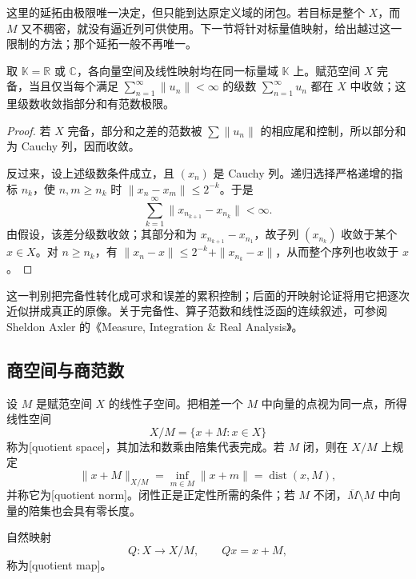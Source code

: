 这里的延拓由极限唯一决定，但只能到达原定义域的闭包。若目标是整个 \(X\)，而 \(M\) 又不稠密，就没有逼近列可供使用。下一节将针对标量值映射，给出越过这一限制的方法；那个延拓一般不再唯一。

\begin{proposition}\label{b1:prop:banach-series-criterion}
取 \(\mathbb K=\mathbb R\) 或 \(\mathbb C\)，各向量空间及线性映射均在同一标量域 \(\mathbb K\) 上。赋范空间 \(X\) 完备，当且仅当每个满足 \(\sum_{n=1}^\infty\|u_n\|<\infty\) 的级数 \(\sum_{n=1}^\infty u_n\) 都在 \(X\) 中收敛；这里级数收敛指部分和有范数极限。
\end{proposition}
\begin{proof}
若 \(X\) 完备，部分和之差的范数被 \(\sum\|u_n\|\) 的相应尾和控制，所以部分和为 Cauchy 列，因而收敛。

反过来，设上述级数条件成立，且 \((x_n)\) 是 Cauchy 列。递归选择严格递增的指标 \(n_k\)，使 \(n,m\geq n_k\) 时 \(\|x_n-x_m\|\leq2^{-k}\)。于是
\[
\sum_{k=1}^\infty\|x_{n_{k+1}}-x_{n_k}\|<\infty.
\]
由假设，该差分级数收敛；其部分和为 \(x_{n_{k+1}}-x_{n_1}\)，故子列 \((x_{n_k})\) 收敛于某个 \(x\in X\)。对 \(n\geq n_k\)，有 \(\|x_n-x\|\leq2^{-k}+\|x_{n_k}-x\|\)，从而整个序列也收敛于 \(x\)。
\end{proof}

这一判别把完备性转化成可求和误差的累积控制；后面的开映射论证将用它把逐次近似拼成真正的原像。关于完备性、算子范数和线性泛函的连续叙述，可参阅 Sheldon Axler 的《Measure, Integration \& Real Analysis》\cite[Sections 6C--6D]{Axler2020Measure}。

\subsection{商空间与商范数}
\label{b1:subsec:080105}

设 \(M\) 是赋范空间 \(X\) 的线性子空间。把相差一个 \(M\) 中向量的点视为同一点，所得线性空间
\[
X/M=\{x+M:x\in X\}
\]
称为[quotient space]，其加法和数乘由陪集代表完成。若 \(M\) 闭，则在 \(X/M\) 上规定
\[
\|x+M\|_{X/M}=\inf_{m\in M}\|x+m\|
=\operatorname{dist}(x,M),
\]
并称它为[quotient norm]。闭性正是正定性所需的条件；若 \(M\) 不闭，\(\overline M\setminus M\) 中向量的陪集也会具有零长度。

\ProseParagraphBreak

自然映射
\[
Q:X\longrightarrow X/M,\qquad Qx=x+M,
\]
称为[quotient map]。

